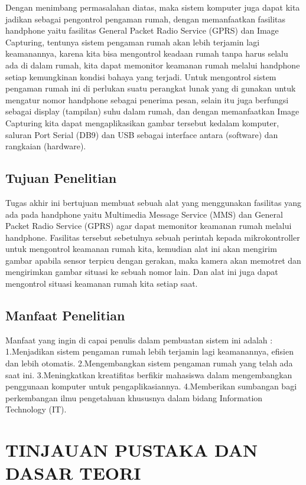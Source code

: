 \documentclass{jtetiproposalskripsi}
\begin{document}
Dengan menimbang permasalahan diatas, maka sistem komputer juga dapat kita jadikan sebagai pengontrol pengaman rumah, dengan memanfaatkan fasilitas handphone yaitu fasilitas General Packet Radio Service (GPRS) dan Image Capturing, tentunya sistem pengaman rumah akan lebih terjamin lagi keamanannya, karena kita bisa mengontrol keadaan rumah tanpa harus selalu ada di dalam rumah, kita dapat memonitor keamanan rumah melalui handphone setiap kemungkinan kondisi bahaya yang terjadi.
Untuk mengontrol sistem pengaman rumah ini di perlukan suatu perangkat lunak yang di gunakan untuk mengatur nomor handphone sebagai penerima pesan, selain itu juga berfungsi sebagai display (tampilan) suhu dalam rumah, dan dengan memanfaatkan Image Capturing kita dapat mengaplikasikan gambar tersebut kedalam komputer, saluran Port Serial (DB9) dan USB sebagai interface antara (software) dan rangkaian (hardware).



\section{Tujuan Penelitian}
Tugas akhir ini bertujuan membuat sebuah alat yang menggunakan fasilitas yang ada pada handphone yaitu Multimedia Message Service (MMS) dan General Packet Radio Service (GPRS) agar dapat memonitor keamanan rumah melalui handphone. Fasilitas tersebut sebetulnya sebuah perintah kepada mikrokontroller untuk mengontrol keamanan rumah kita, kemudian alat ini akan mengirim gambar apabila sensor terpicu dengan gerakan, maka kamera akan memotret dan mengirimkan gambar situasi ke sebuah nomor lain. Dan alat ini juga dapat mengontrol situasi keamanan rumah kita setiap saat.


\section{Manfaat Penelitian}
Manfaat yang ingin di capai penulis dalam pembuatan sistem ini adalah :
1.Menjadikan sistem pengaman rumah lebih terjamin lagi keamanannya, efisien dan lebih otomatis. 
2.Mengembangkan sistem pengaman rumah yang telah ada saat ini.
3.Meningkatkan kreatifitas berfikir mahasiswa dalam mengembangkan penggunaan komputer untuk pengaplikasiannya.
4.Memberikan sumbangan bagi perkembangan ilmu pengetahuan khususnya dalam bidang Information Technology (IT).
\chapter{TINJAUAN PUSTAKA DAN DASAR TEORI}                
\end{document}
